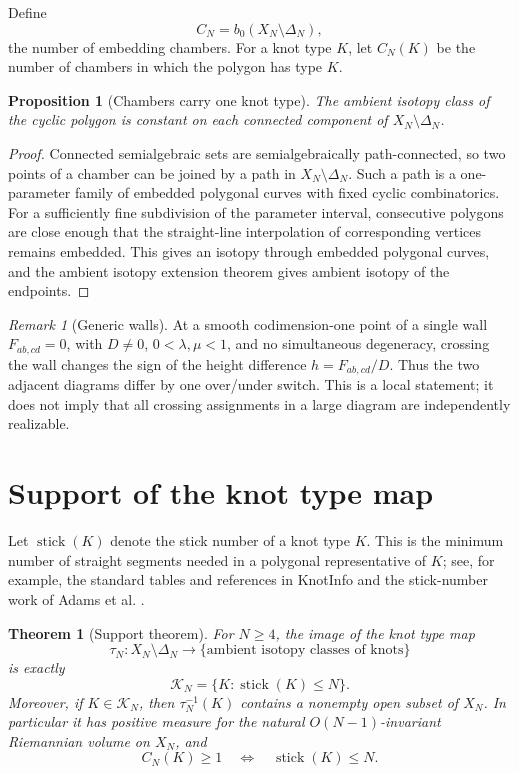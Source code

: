 \documentclass[11pt]{article}
\newtheorem{theorem}{Theorem}
\newtheorem{proposition}{Proposition}
\theoremstyle{remark}
\newtheorem{remark}{Remark}
\theoremstyle{plain}
\newcommand{\Kcal}{\mathcal{K}}
\begin{document}
Define
\[
    C_N=b_0(X_N\setminus\Delta_N),
\]
the number of embedding chambers.  For a knot type \(K\), let \(C_N(K)\) be
the number of chambers in which the polygon has type \(K\).

\begin{proposition}[Chambers carry one knot type]\label{prop:chambers}
The ambient isotopy class of the cyclic polygon is constant on each connected
component of \(X_N\setminus\Delta_N\).
\end{proposition}

\begin{proof}
Connected semialgebraic sets are semialgebraically path-connected, so two
points of a chamber can be joined by a path in
\(X_N\setminus\Delta_N\).  Such a path is a one-parameter family of embedded
polygonal curves with fixed cyclic combinatorics.  For a sufficiently fine
subdivision of the parameter interval, consecutive polygons are close enough
that the straight-line interpolation of corresponding vertices remains
embedded.  This gives an isotopy through embedded polygonal curves, and the
ambient isotopy extension theorem \cite{EdwardsKirby} gives ambient isotopy of
the endpoints.
\end{proof}

\begin{remark}[Generic walls]
At a smooth codimension-one point of a single wall \(F_{ab,cd}=0\), with
\(D\ne0\), \(0<\lambda,\mu<1\), and no simultaneous degeneracy, crossing the
wall changes the sign of the height difference \(h=F_{ab,cd}/D\).  Thus the
two adjacent diagrams differ by one over/under switch.  This is a local
statement; it does not imply that all crossing assignments in a large diagram
are independently realizable.
\end{remark}

\section{Support of the knot type map}

Let \(\operatorname{stick}(K)\) denote the stick number of a knot type \(K\).
This is the minimum number of straight segments needed in a polygonal
representative of \(K\); see, for example, the standard tables and references in
KnotInfo \cite{KnotInfoStick} and the stick-number work of Adams et al.
\cite{AdamsStick}.

\begin{theorem}[Support theorem]\label{thm:support}
For \(N\ge4\), the image of the knot type map
\[
    \tau_N:X_N\setminus\Delta_N\longrightarrow
    \{\text{ambient isotopy classes of knots}\}
\]
is exactly
\[
    \Kcal_N=\{K:\operatorname{stick}(K)\le N\}.
\]
Moreover, if \(K\in\Kcal_N\), then \(\tau_N^{-1}(K)\) contains a nonempty open
subset of \(X_N\).  In particular it has positive measure for the natural
\(O(N-1)\)-invariant Riemannian volume on \(X_N\), and
\[
    C_N(K)\ge1
    \quad\Longleftrightarrow\quad
    \operatorname{stick}(K)\le N.
\]
\end{theorem}
\end{document}
